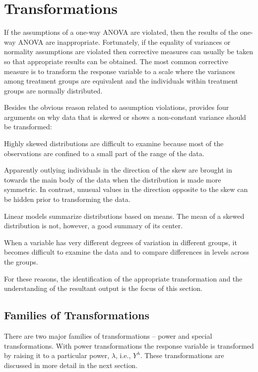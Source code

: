 \documentclass[10pt,openany]{book}\usepackage[]{graphicx}\usepackage[]{color}
\begin{document}
\section{Transformations} \label{sect:AOVTransformations}
If the assumptions of a one-way ANOVA are violated, then the results of the one-way ANOVA are inappropriate.  Fortunately, if the equality of variances or normality assumptions are violated then corrective measures can usually be taken so that appropriate results can be obtained.  The most common corrective measure is to transform the response variable to a scale where the variances among treatment groups are equivalent and the individuals within treatment groups are normally distributed.

Besides the obvious reason related to assumption violations, \cite{Fox1997} provides four arguments on why data that is skewed or shows a non-constant variance should be transformed:

\begin{Itemize}
  \item Highly skewed distributions are difficult to examine because most of the observations are confined to a small part of the range of the data.
  \item Apparently outlying individuals in the direction of the skew are brought in towards the main body of the data when the distribution is made more symmetric.  In contrast, unusual values in the direction opposite to the skew can be hidden prior to transforming the data.
  \item Linear models summarize distributions based on means.  The mean of a skewed distribution is not, however, a good summary of its center.
  \item When a variable has very different degrees of variation in different groups, it becomes difficult to examine the data and to compare differences in levels across the groups.
\end{Itemize}

For these reasons, the identification of the appropriate transformation and the understanding of the resultant output is the focus of this section.


\subsection{Families of Transformations}
There are two major families of transformations -- power and special transformations.  With power transformations the response variable is transformed by raising it to a particular power, $\lambda$, i.e., $Y^{\lambda}$.  These transformations are discussed in more detail in the next section.
\end{document}
